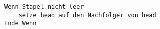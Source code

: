 \begin{lstlisting}
Wenn Stapel nicht leer
    setze head auf den Nachfolger von head
Ende Wenn
\end{lstlisting}
